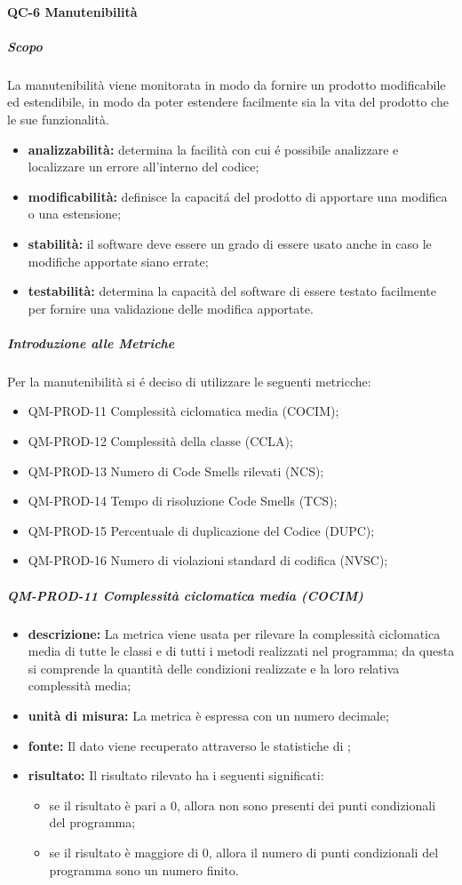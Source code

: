 		\paragraph{QC-6 Manutenibilità}
			\subparagraph{Scopo}
				La manutenibilità viene monitorata in modo da fornire un prodotto modificabile ed estendibile, in modo da poter estendere facilmente sia la vita del prodotto che le sue funzionalità.
				\begin{itemize}
					\item \textbf{analizzabilità:} determina la facilità con cui é possibile analizzare e localizzare un errore all'interno del codice;
					\item \textbf{modificabilità:} definisce la capacitá del prodotto di apportare una modifica o una estensione;
					\item \textbf{stabilità:} il software deve essere un grado di essere usato anche in caso le modifiche apportate siano errate;
					\item \textbf{testabilità:} determina la capacità del software di essere testato facilmente per fornire una validazione delle modifica apportate.
				\end{itemize}
			\subparagraph{Introduzione alle Metriche}
				Per la manutenibilità si é deciso di utilizzare le seguenti metricche:
				\begin{itemize}
					\item QM-PROD-11 Complessità ciclomatica media (COCIM);
					\item QM-PROD-12 Complessità della classe (CCLA);
					\item QM-PROD-13 Numero di Code Smells rilevati (NCS);
					\item QM-PROD-14 Tempo di risoluzione Code Smells (TCS);
					\item QM-PROD-15 Percentuale di duplicazione del Codice (DUPC);
					\item QM-PROD-16 Numero di violazioni standard di codifica (NVSC);
				\end{itemize}
			\subparagraph{QM-PROD-11 Complessità ciclomatica media (COCIM)}
			\begin{itemize}
      			\item \textbf{descrizione: }
					La metrica viene usata per rilevare la complessità ciclomatica media di tutte le classi e di tutti i metodi realizzati nel programma; da questa si comprende la quantità delle condizioni realizzate e la loro relativa complessità media;
				\item \textbf{unità di misura: }
					La metrica è espressa con un numero decimale;
				\item \textbf{fonte: }
					Il dato viene recuperato attraverso le statistiche di ;
				\item \textbf{risultato: }
					Il risultato rilevato ha i seguenti significati:
					\begin{itemize}
						\item se il risultato è pari a 0, allora non sono presenti dei punti condizionali del programma;
						\item se il risultato è maggiore di 0, allora il numero di punti condizionali del programma sono un numero finito.
					\end{itemize}
			\end{itemize}
